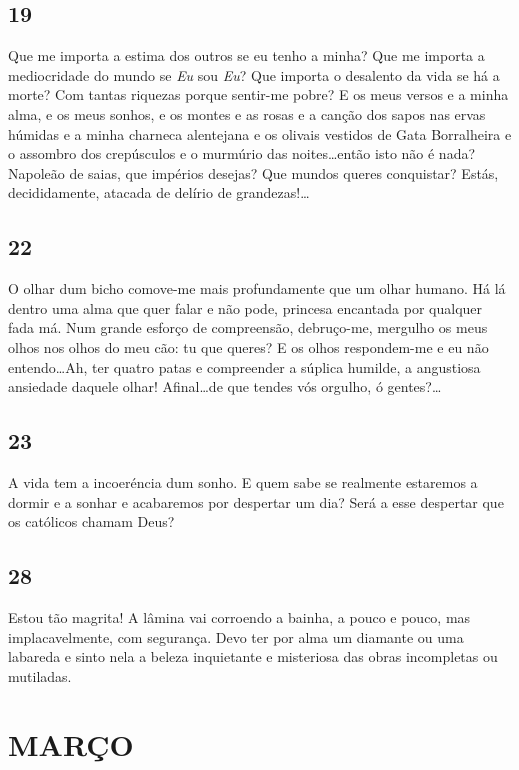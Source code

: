 \subsection{19} 

Que me importa a estima dos outros se eu tenho
a minha? Que me importa a mediocridade do mundo
se \textit{Eu} sou \textit{Eu}? Que importa o desalento da vida se há
a morte? Com tantas riquezas porque sentir-me pobre?
E os meus versos e a minha alma, e os meus sonhos,
e os montes e as rosas e a canção dos sapos nas ervas
húmidas e a minha charneca alentejana e os olivais
vestidos de Gata Borralheira e o assombro dos 
crepúsculos e o murmúrio das noites\ldots então isto não é
nada? Napoleão de saias, que impérios desejas? Que
mundos queres conquistar? Estás, decididamente, 
atacada de delírio de grandezas!\ldots

\subsection{22} 

O olhar dum bicho comove-me mais 
profundamente que um olhar humano. Há lá dentro 
uma alma que quer falar e não pode, princesa encantada
por qualquer fada má. Num grande esforço de compreensão,
debruço-me, mergulho os meus olhos nos olhos do
meu cão: tu que queres? E os olhos respondem-me e
eu não entendo\ldots Ah, ter quatro patas e compreender
a súplica humilde, a angustiosa ansiedade daquele
olhar! Afinal\ldots de que tendes vós orgulho, ó gentes?\ldots

\subsection{23} 

A vida tem a incoeréncia dum sonho. E quem sabe se realmente
estaremos a dormir e a sonhar e acabaremos por
despertar um dia? Será a esse despertar que os católicos
chamam Deus?

\subsection{28} 

Estou tão magrita! A lâmina vai corroendo a
bainha, a pouco e pouco, mas implacavelmente, com
segurança. Devo ter por alma um diamante ou uma
labareda e sinto nela a beleza inquietante e misteriosa
das obras incompletas ou mutiladas.

\section{MARÇO}


